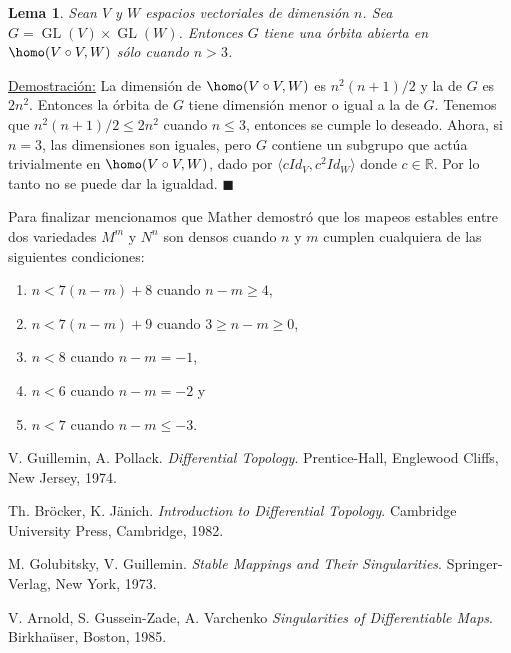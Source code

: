\documentclass{report}
\newtheorem{lem}[theorem]{Lema}
\theoremstyle{definition}
\DeclareMathOperator{\gl}{GL}
\let\hom\homo
\DeclareMathOperator{\hom}{Hom}
\begin{document}
\begin{lem}
Sean $V$ y $W$ espacios vectoriales de dimensi\'on $n$. Sea $G= \gl (V) \times \gl (W)$. Entonces $G$ tiene una \'orbita abierta en $\hom (V \circ V, W)$ s\'olo cuando $n >3$.
\end{lem}
\underline{Demostraci\'on:} La dimensi\'on de $\hom (V \circ V , W)$ es $n^2 (n+1) / 2$ y la de $G$ es $2n^2$. Entonces la \'orbita de $G$ tiene dimensi\'on menor o igual a la de $G$. Tenemos que $n^2 (n+1) / 2  \leq 2n^2$ cuando $n \leq 3$, entonces se cumple lo deseado. Ahora, si $n=3$, las dimensiones son iguales, pero $G$ contiene un subgrupo que act\'ua trivialmente en $\hom (V \circ V , W)$, dado por $\langle c Id_V , c^2 Id_W\rangle$ donde $c \in \mathbb{R}$. Por lo tanto no se puede dar la igualdad. $\blacksquare$

Para finalizar mencionamos que Mather demostr\'o que los mapeos estables entre dos variedades $M^m$ y $N^n$ son densos cuando $n$ y $m$ cumplen cualquiera de las siguientes condiciones:
\begin{enumerate}

\item $n < 7(n - m) + 8$ cuando $n-m \geq 4$,
\item $n < 7 (n -m) + 9$ cuando $3 \geq n - m \geq 0$,
\item $n < 8$ cuando $n - m = -1$,
\item $n < 6$ cuando $n - m = -2$ y
\item $n < 7$ cuando $ n - m \leq  - 3$.
\end{enumerate}

\begin{thebibliography}{9}
V. Guillemin, A. Pollack. 
\textit{Differential Topology}. 
Prentice-Hall, Englewood Cliffs, New Jersey, 1974.
 
 Th. Bröcker, K. Jänich.
\textit{Introduction to Differential Topology}.
Cambridge University Press, Cambridge, 1982.
 
M. Golubitsky, V. Guillemin.
\textit{Stable Mappings and Their Singularities}. 
Springer-Verlag, New York, 1973.
 
V. Arnold, S. Gussein-Zade, A. Varchenko
\textit{Singularities of Differentiable Maps}. 
Birkhaüser, Boston, 1985.
\end{thebibliography}
\end{document}
